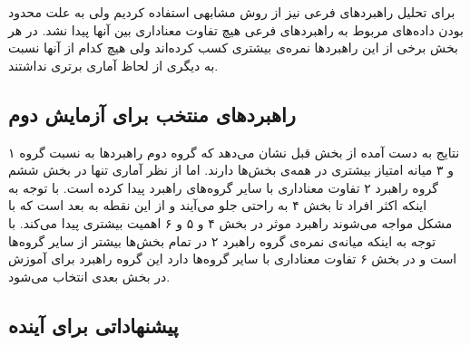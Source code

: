 \documentclass[twoside, a4paper,11pt]{book}
\numberwithin{equation}{chapter}
\numberwithin{table}{chapter}
\numberwithin{figure}{chapter}
\numberwithin{equation}{chapter}
\begin{document}
\begin{table}[]
\end{table}

برای تحلیل راهبردهای فرعی نیز از روش مشابهی استفاده کردیم ولی به علت محدود بودن داده‌های مربوط به راهبردهای فرعی هیچ تفاوت معناداری بین آنها پیدا نشد. در هر بخش برخی از این راهبردها نمره‌ی بیشتری کسب کرده‌اند ولی هیچ کدام از آنها نسبت به دیگری از لحاظ آماری برتری نداشتند.


\subsection{راهبردهای منتخب برای آزمایش دوم}

نتایج به دست آمده از بخش قبل نشان می‌دهد که گروه دوم راهبردها به نسبت گروه ۱ و ۳ میانه امتیاز بیشتری در همه‌ی بخش‌ها دارند. اما از نظر آماری تنها در بخش ششم گروه راهبرد ۲ تفاوت معناداری با سایر گروه‌های راهبرد پیدا کرده است. با توجه به اینکه اکثر افراد تا بخش ۴ به راحتی جلو می‌آیند و از این نقطه به بعد است که با مشکل مواجه می‌شوند راهبرد موثر در بخش ۴ و ۵ و ۶ اهمیت بیشتری پیدا می‌کند. با توجه به اینکه میانه‌ی نمره‌ی گروه راهبرد ۲ در تمام بخش‌ها بیشتر از سایر گروه‌ها است و در بخش ۶ تفاوت معناداری با سایر گروه‌ها دارد این گروه راهبرد برای آموزش در بخش بعدی انتخاب می‌شود.

\subsection{پیشنهاداتی برای آینده}
\end{document}
